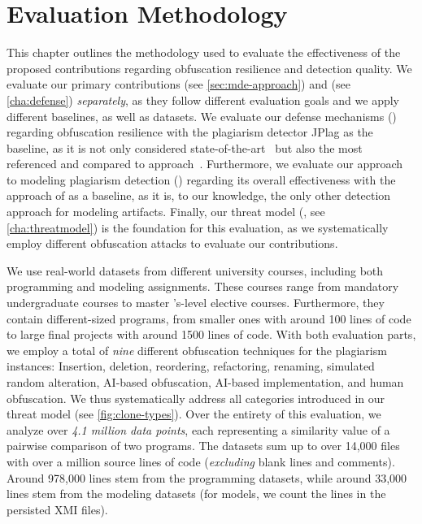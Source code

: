 \chapter{Evaluation Methodology}\label{cha:methodology}
This chapter outlines the methodology used to evaluate the effectiveness of the proposed contributions regarding obfuscation resilience and detection quality.
We evaluate our primary contributions  (see \autoref{sec:mde-approach}) and  (see \autoref{cha:defense}) \textit{separately}, as they follow different evaluation goals and we apply different baselines, as well as datasets.
%
We evaluate our defense mechanisms () regarding obfuscation resilience with the plagiarism detector JPlag as the baseline, as it is not only considered state-of-the-art~\cite{Aniceto2021} but also the most referenced and compared to approach~\cite{Novak2019}.
Furthermore, we evaluate our approach to modeling plagiarism detection () regarding its overall effectiveness with the approach of \citet{Martinez2020} as a baseline, as it is, to our knowledge, the only other detection approach for modeling artifacts.
Finally, our threat model (, see \autoref{cha:threatmodel}) is the foundation for this evaluation, as we systematically employ different obfuscation attacks to evaluate our contributions. 

We use real-world datasets from different university courses, including both programming and modeling assignments. These courses range from mandatory undergraduate courses to master 's-level elective courses. Furthermore, they contain different-sized programs, from smaller ones with around 100 lines of code to large final projects with around 1500 lines of code.
With both evaluation parts, we employ a total of \textit{nine} different obfuscation techniques for the plagiarism instances:
Insertion, deletion, reordering, refactoring, renaming, simulated random alteration, AI-based obfuscation, AI-based implementation, and human obfuscation.
We thus systematically address all categories introduced in our threat model (see \autoref{fig:clone-types}).
%
Over the entirety of this evaluation, we analyze over \textit{4.1 million data points}, each representing a similarity value of a pairwise comparison of two programs. The datasets sum up to over 14,000 files with over a million source lines of code (\textit{excluding} blank lines and comments). Around 978,000 lines stem from the programming datasets, while around 33,000 lines stem from the modeling datasets (for models, we count the lines in the persisted \ac{XMI} files).


